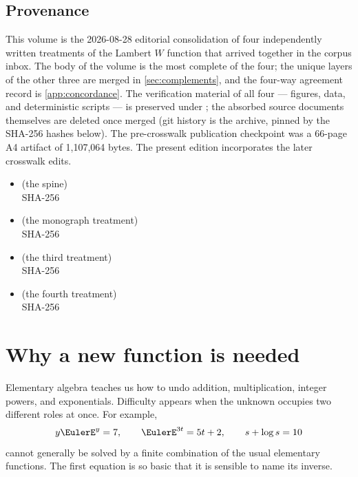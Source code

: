 \documentclass[11pt]{article}
\theoremstyle{remark}
\begin{document}
\subsection*{Provenance}
This volume is the 2026-08-28 editorial consolidation of four independently
written treatments of the Lambert $W$ function that arrived together in the
corpus inbox.  The body of the volume is the most complete of the four; the
unique layers of the other three are merged in
\cref{sec:complements}, and the four-way agreement record is
\cref{app:concordance}.  The verification material of all four --- figures,
data, and deterministic scripts --- is preserved under ; the
absorbed source documents themselves are deleted once merged (git history is
the archive, pinned by the SHA-256 hashes below).
The pre-crosswalk publication checkpoint was a 66-page A4 artifact of
1,107,064 bytes.  The present edition incorporates the later crosswalk edits.
\begin{itemize}
\item {} (the spine)\\
{\footnotesize SHA-256 }
\item {} (the monograph treatment)\\
{\footnotesize SHA-256 }
\item {} (the third treatment)\\
{\footnotesize SHA-256 }
\item {} (the fourth treatment)\\
{\footnotesize SHA-256 }
\end{itemize}

\tableofcontents
\clearpage

\section{Why a new function is needed}

Elementary algebra teaches us how to undo addition, multiplication, integer
powers, and exponentials.  Difficulty appears when the unknown occupies two
different roles at once.  For example,
\[
   y\EulerE^y=7,\qquad
   \EulerE^{3t}=5t+2,\qquad
   s+\log s=10
\]
cannot generally be solved by a finite combination of the usual elementary
functions.  The first equation is so basic that it is sensible to name its
inverse.
\end{document}
